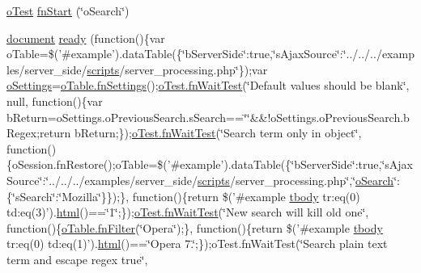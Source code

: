 \begin{DoxyCompactItemize}
\item 
\hyperlink{unit__test_8js_a3b2d259e2df3b6860d9047a92d09d0d6}{o\+Test} \hyperlink{4__server-side_2o_search_8js_a9b420ccec9a1183ec9e2033ca27e0e7c}{fn\+Start} (\char`\"{}o\+Search\char`\"{})
\item 
\hyperlink{outside_events_8js_aa14f8e0338cced6720590fd2ea13bd4b}{document} \hyperlink{4__server-side_2o_search_8js_a61d4e501f9e36b57754acbc83b89be99}{ready} (function()\{var o\+Table=\$('\#example').data\+Table(\{\char`\"{}b\+Server\+Side\char`\"{}\+:true,\char`\"{}s\+Ajax\+Source\char`\"{}\+:\char`\"{}../../../examples/server\+\_\+side/\hyperlink{tinymce_8jquery_8dev_8js_a09066d4d580eeec222f858d588b4cdef}{scripts}/server\+\_\+processing.\+php\char`\"{}\});var \hyperlink{model_8settings_8js_a4857b9c813b4dea010668e9555d0aca7}{o\+Settings}=\hyperlink{api_8methods_8js_a78f387fab92a85c2cb7830bc5d8a6141}{o\+Table.\+fn\+Settings}();\hyperlink{onhold_24__server-side_2__zero__config_8js_ab25c4d596771c0133cdc45178ce72c3d}{o\+Test.\+fn\+Wait\+Test}(\char`\"{}Default values should be blank\char`\"{}, null, function()\{var b\+Return=o\+Settings.\+o\+Previous\+Search.\+s\+Search==\char`\"{}\char`\"{}\&\&!o\+Settings.\+o\+Previous\+Search.\+b\+Regex;return b\+Return;\});\hyperlink{onhold_24__server-side_2__zero__config_8js_ab25c4d596771c0133cdc45178ce72c3d}{o\+Test.\+fn\+Wait\+Test}(\char`\"{}Search term only in object\char`\"{}, function()\{o\+Session.\+fn\+Restore();o\+Table=\$('\#example').data\+Table(\{\char`\"{}b\+Server\+Side\char`\"{}\+:true,\char`\"{}s\+Ajax\+Source\char`\"{}\+:\char`\"{}../../../examples/server\+\_\+side/\hyperlink{tinymce_8jquery_8dev_8js_a09066d4d580eeec222f858d588b4cdef}{scripts}/server\+\_\+processing.\+php\char`\"{},\char`\"{}\hyperlink{model_8search_8js_a85bb7e502bb77d88d1b8ca92c902420c}{o\+Search}\char`\"{}\+:\{\char`\"{}s\+Search\char`\"{}\+:\char`\"{}Mozilla\char`\"{}\}\});\}, function()\{return \$('\#example \hyperlink{core_8constructor_8js_a99b0542c7c50fe8757c55bf9dac5f3be}{tbody} tr\+:eq(0) td\+:eq(3)').\hyperlink{tinymce_8jquery_8dev_8js_ac2090bcf2ff968c0083d5de53a6544f3}{html}()==\char`\"{}1\char`\"{};\});\hyperlink{onhold_24__server-side_2__zero__config_8js_ab25c4d596771c0133cdc45178ce72c3d}{o\+Test.\+fn\+Wait\+Test}(\char`\"{}New search will kill old one\char`\"{}, function()\{\hyperlink{api_8methods_8js_a7b6987d0a9ab9c5303d10ef62790885d}{o\+Table.\+fn\+Filter}(\char`\"{}Opera\char`\"{});\}, function()\{return \$('\#example \hyperlink{core_8constructor_8js_a99b0542c7c50fe8757c55bf9dac5f3be}{tbody} tr\+:eq(0) td\+:eq(1)').\hyperlink{tinymce_8jquery_8dev_8js_ac2090bcf2ff968c0083d5de53a6544f3}{html}()==\char`\"{}Opera 7.\char`\"{};\});o\+Test.\+fn\+Wait\+Test(\char`\"{}Search plain text term and escape regex true\char`\"{}, 
\end{DoxyCompactItemize}
